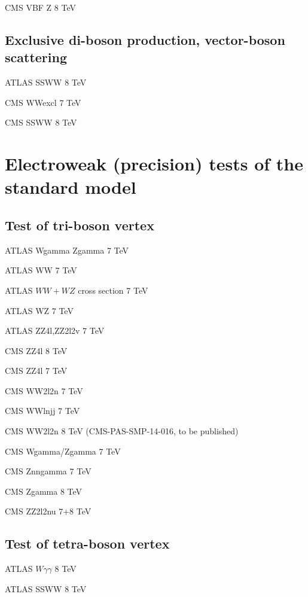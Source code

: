 \documentclass[12pt]{iopart}
\begin{document}
CMS VBF Z 8 TeV~\cite{Khachatryan:2014dea}

\subsection{Exclusive di-boson production, vector-boson scattering}

ATLAS SSWW 8 TeV~\cite{Aad:2014zda}

CMS WWexcl 7 TeV~\cite{Chatrchyan:2013foa}

CMS SSWW 8 TeV~\cite{Khachatryan:2014sta}

\section{Electroweak (precision) tests of the standard model}
\subsection{Test of tri-boson vertex}

ATLAS Wgamma Zgamma 7 TeV~\cite{Aad:2013izg}

ATLAS WW 7 TeV~\cite{ATLAS:2012mec}

ATLAS $WW+WZ$ cross section 7 TeV~\cite{Aad:2014mda}

ATLAS WZ 7 TeV~\cite{Aad:2012twa}

ATLAS ZZ4l,ZZ2l2v 7 TeV~\cite{Aad:2012awa}

CMS ZZ4l 8 TeV~\cite{Khachatryan:2014dia}

CMS ZZ4l 7 TeV~\cite{Chatrchyan:2012sga}

CMS WW2l2n 7 TeV~\cite{Chatrchyan:2013yaa}

CMS WWlnjj 7 TeV~\cite{Chatrchyan:2012bd}

CMS WW2l2n 8 TeV (CMS-PAS-SMP-14-016, to be published)

CMS Wgamma/Zgamma 7 TeV~\cite{Chatrchyan:2013fya}

CMS Znngamma 7 TeV~\cite{Chatrchyan:2013nda}

CMS Zgamma 8 TeV~\cite{Khachatryan:2015kea}

CMS ZZ2l2nu 7+8 TeV~\cite{Khachatryan:2015pba}

\subsection{Test of tetra-boson vertex}

ATLAS $W\gamma\gamma$ 8 TeV~\cite{Aad:2015uqa}

ATLAS SSWW 8 TeV~\cite{Aad:2014zda}
\end{document}
